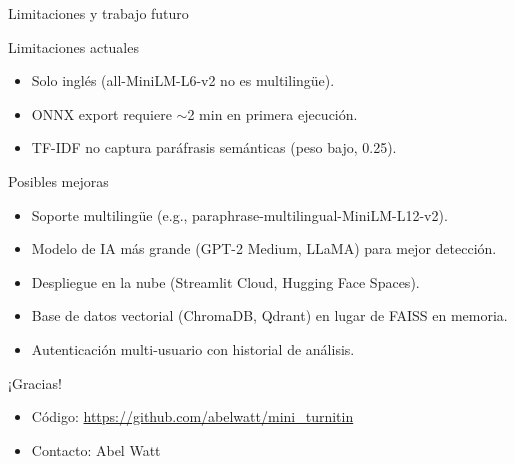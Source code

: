 \documentclass[aspectratio=169]{beamer}
\begin{document}
\begin{frame}{Limitaciones y trabajo futuro}
  \begin{block}{Limitaciones actuales}
    \begin{itemize}
      \item Solo inglés (all-MiniLM-L6-v2 no es multilingüe).
      \item ONNX export requiere $\sim$2 min en primera ejecución.
      \item TF-IDF no captura paráfrasis semánticas (peso bajo, 0.25).
    \end{itemize}
  \end{block}
  \vspace{0.5em}
  \begin{block}{Posibles mejoras}
    \begin{itemize}
      \item Soporte multilingüe (e.g., paraphrase-multilingual-MiniLM-L12-v2).
      \item Modelo de IA más grande (GPT-2 Medium, LLaMA) para mejor detección.
      \item Despliegue en la nube (Streamlit Cloud, Hugging Face Spaces).
      \item Base de datos vectorial (ChromaDB, Qdrant) en lugar de FAISS en memoria.
      \item Autenticación multi-usuario con historial de análisis.
    \end{itemize}
  \end{block}
\end{frame}

\begin{frame}
  \centering
  \vfill
  {\Huge ¡Gracias!}
  \vfill
  \begin{itemize}
    \item Código: \url{https://github.com/abelwatt/mini_turnitin}
    \item Contacto: Abel Watt
  \end{itemize}
  \vfill
\end{frame}
\end{document}
